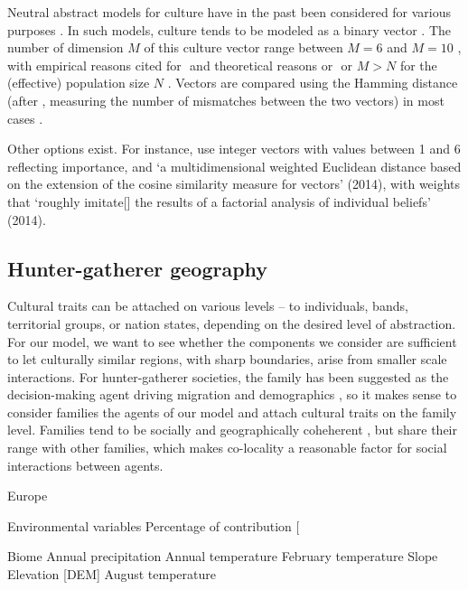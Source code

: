 \documentclass[a4paper,12pt]{scrartcl}
\begin{document}
Neutral abstract models for culture have in the past been considered for various
purposes \parencite{komarova2001evolutionary}. In such models, culture tends to
be modeled as a binary vector
\parencite{fogarty2017driving,pascual2020epistasis}. The number of dimension $M$
of this culture vector range between $M=6$ \parencite{pascual2020epistasis} and
$M=10$ \parencite{delcastillo2013modeling}, with empirical reasons cited for $ $
\parencite{} and theoretical reasons or $ $ \parencite{} or $M>N$ for the
(effective) population size $N$ \parencite{fogarty2017driving}. Vectors are
compared using the Hamming distance (after \textcite{}, measuring the number of
mismatches between the two vectors) in most cases
\parencite{fogarty2017driving,pascual2020epistasis}.

Other options exist. For instance,
\textcite{barcelo2014social,barcelo2015simulating} use integer vectors with
values between 1 and 6 reflecting importance, and ‘a multidimensional weighted
Euclidean distance based on the extension of the cosine similarity measure for
vectors’ (2014), with weights that ‘roughly imitate[] the results of a factorial
analysis of individual beliefs’ (2014).

\subsection{Hunter-gatherer geography}
\label{s:geography}
Cultural traits can be attached on various levels – to individuals, bands,
territorial groups, or nation states, depending on the desired level of
abstraction. For our model, we want to see whether the components we consider
are sufficient to let culturally similar regions, with sharp boundaries, arise
from smaller scale interactions. For hunter-gatherer societies, the family has
been suggested as the decision-making agent driving migration and demographics
\textcite{}, so it makes sense to consider families the agents of our model and
attach cultural traits on the family level. Families tend to be socially and
geographically coheherent \textcite{}, but share their range with other
families, which makes co-locality a reasonable factor for social interactions
between agents.

\cite{kondo2012developing}
Europe

Environmental variables Percentage of contribution [%

Biome
Annual precipitation
Annual temperature
February temperature
Slope
Elevation [DEM]
August temperature
\end{document}
